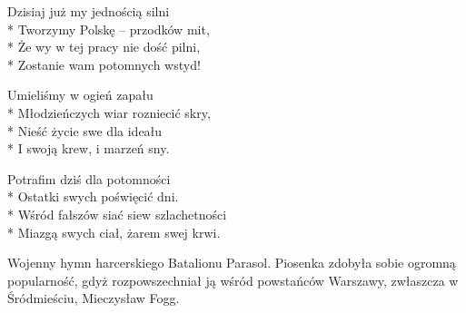 \begin{lyrics}[longestline={Na stos rzuciliśmy -- nasz życia los,}]
Dzisiaj już my jednością silni\\*
Tworzymy Polskę -- przodków mit,\\*
Że wy w tej pracy nie dość pilni,\\*
Zostanie wam potomnych wstyd!

\chorusref

Umieliśmy w ogień zapału\\*
Młodzieńczych wiar rozniecić skry,\\*
Nieść życie swe dla ideału\\*
I swoją krew, i marzeń sny.

\chorusref

Potrafim dziś dla potomności\\*
Ostatki swych poświęcić dni.\\*
Wśród fałszów siać siew szlachetności\\*
Miazgą swych ciał, żarem swej krwi.

\chorusref
\end{lyrics}



\begin{info} Wojenny hymn harcerskiego Batalionu Parasol. Piosenka zdobyła sobie ogromną popularność, gdyż rozpowszechniał ją wśród powstańców Warszawy, zwłaszcza w Śródmieściu, Mieczysław Fogg.\end{info}

